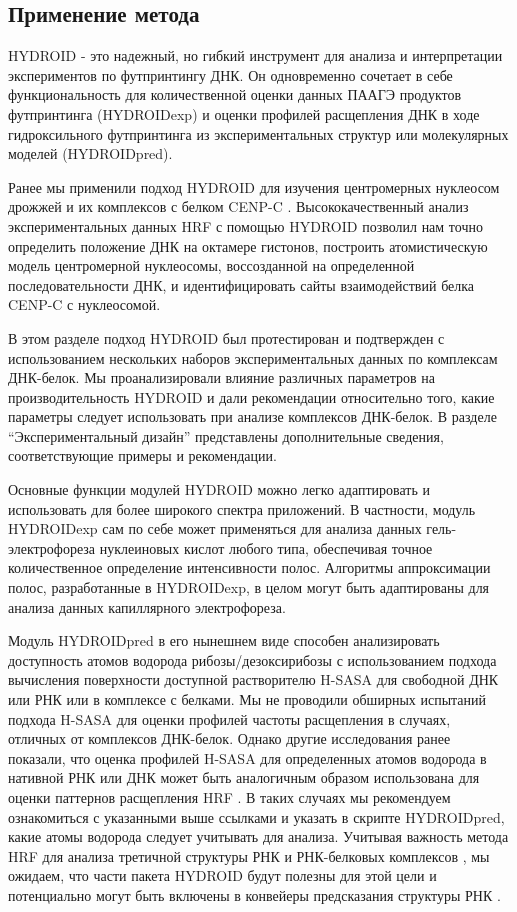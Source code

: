 \subsection{Применение метода}

    HYDROID - это надежный, но гибкий инструмент для анализа и интерпретации экспериментов по футпринтингу ДНК. Он одновременно сочетает в себе функциональность для количественной оценки данных ПААГЭ продуктов футпринтинга (HYDROIDexp) и оценки профилей расщепления ДНК в ходе гидроксильного футпринтинга из экспериментальных структур или молекулярных моделей (HYDROIDpred).

    Ранее мы применили подход HYDROID для изучения центромерных нуклеосом дрожжей и их комплексов с белком CENP-C \cite{shaytan_hydroxyl-radical_2017,xiao_molecular_2017}. Высококачественный анализ экспериментальных данных HRF с помощью HYDROID позволил нам точно определить положение ДНК на октамере гистонов, построить атомистическую модель центромерной нуклеосомы, воссозданной на определенной последовательности ДНК, и идентифицировать сайты взаимодействий белка CENP-C с нуклеосомой.

    В этом разделе подход HYDROID был протестирован и подтвержден с использованием нескольких наборов экспериментальных данных по комплексам ДНК-белок. Мы проанализировали влияние различных параметров на производительность HYDROID и дали рекомендации относительно того, какие параметры следует использовать при анализе комплексов ДНК-белок. В разделе ``Экспериментальный дизайн'' представлены дополнительные сведения, соответствующие примеры и рекомендации.

    Основные функции модулей HYDROID можно легко адаптировать и использовать для более широкого спектра приложений. В частности, модуль HYDROIDexp сам по себе может применяться для анализа данных гель-электрофореза нуклеиновых кислот любого типа, обеспечивая точное количественное определение интенсивности полос. Алгоритмы аппроксимации полос, разработанные в HYDROIDexp, в целом могут быть адаптированы для анализа данных капиллярного электрофореза.

    Модуль HYDROIDpred в его нынешнем виде способен анализировать доступность атомов водорода рибозы/дезоксирибозы с использованием подхода вычисления поверхности доступной растворителю H-SASA для свободной ДНК или РНК или в комплексе с белками. Мы не проводили обширных испытаний подхода H-SASA для оценки профилей частоты расщепления в случаях, отличных от комплексов ДНК-белок. Однако другие исследования ранее показали, что оценка профилей H-SASA для определенных атомов водорода в нативной РНК или ДНК может быть аналогичным образом использована для оценки паттернов расщепления HRF \cite{bishop_map_2011,ingle_chemical_2014}. В таких случаях мы рекомендуем ознакомиться с указанными выше ссылками и указать в скрипте HYDROIDpred, какие атомы водорода следует учитывать для анализа. Учитывая важность метода HRF для анализа третичной структуры РНК и РНК-белковых комплексов \cite{costa_probing_2014,hampel_time-resolved_2001,nilsen_mapping_2014}, мы ожидаем, что части пакета HYDROID будут полезны для этой цели и потенциально могут быть включены в конвейеры предсказания структуры РНК \cite{ding_three-dimensional_2012,tian_rna_2016}.


